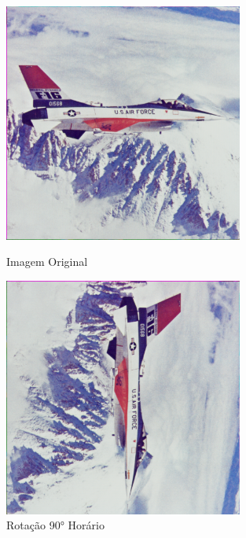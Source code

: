 \documentclass[a4paper, 11pt, portuguese]{article}
\begin{document}
\begin{figure}[htbp]
\centering
\begin{minipage}{0.48\textwidth}
    \centering
    \includegraphics[width=0.7\textwidth]{imagens/airplane.png} %
    \caption*{Imagem Original}
\end{minipage}
\hfill
\begin{minipage}{0.48\textwidth}
    \centering
    \includegraphics[width=0.7\textwidth]{imagens/airplane_rotated90.png}
    \caption*{Rotação 90° Horário}
\end{minipage}
\hfill
\begin{minipage}{0.48\textwidth}
    \centering

\end{minipage}
\end{figure}
\end{document}
